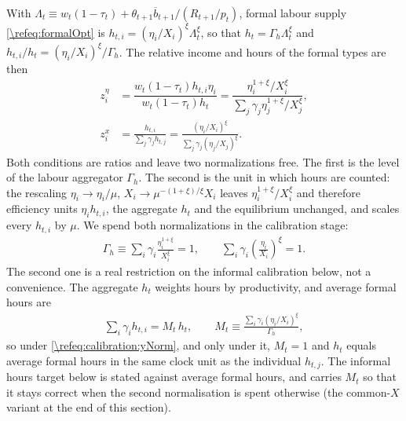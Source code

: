 With $\Lambda_t\equiv w_t(1-\tau_t)+\theta_{t+1}\overline{b}_{t+1}/(R_{t+1}/p_t)$, formal labour supply \eqref{\refeq:formalOpt} is $h_{t,i} = (\eta_i/X_i)^{\xi}\Lambda_t^{\xi}$, so that $h_t = \Gamma_h\Lambda_t^{\xi}$ and $h_{t,i}/h_t = (\eta_i/X_i)^{\xi}/\Gamma_h$. The relative income and hours of the formal types are then
\begin{align*}
        z_i^{\eta} &= \dfrac{w_t(1-\tau_t)h_{t,i} \eta_i}{w_t(1-\tau_t)h_t} = \dfrac{\eta_i^{1+\xi}/X_i^{\xi}}{\sum_{j} \gamma_ j\eta_j^{1+\xi}/X_j^{\xi}},  \\
        z_i^{x} &= \frac{h_{t,i}}{\sum_j\gamma_j h_{t,j}} = \frac{(\eta_i/X_i)^{\xi}}{\sum_j \gamma_j(\eta_j/X_j)^{\xi}}.
\end{align*}
Both conditions are ratios and leave two normalizations free. The first is the level of the labour aggregator $\Gamma_h$. The second is the unit in which hours are counted: the rescaling $\eta_i\rightarrow\eta_i/\mu$, $X_i\rightarrow\mu^{-(1+\xi)/\xi}X_i$ leaves $\eta_i^{1+\xi}/X_i^{\xi}$ and therefore efficiency units $\eta_ih_{t,i}$, the aggregate $h_t$ and the equilibrium unchanged, and scales every $h_{t,i}$ by $\mu$. We spend both normalizations in the calibration stage:
\begin{align}\label{\refeq:calibration:yNorm}
    \Gamma_h\equiv\sum_i\gamma_i\frac{\eta_i^{1+\xi}}{X_i^{\xi}} = 1, \qquad \sum_i\gamma_i\left(\frac{\eta_i}{X_i}\right)^{\xi} = 1.
\end{align}
The second one is a real restriction on the informal calibration below, not a convenience. The aggregate $h_t$ weights hours by productivity, and average formal hours are
\begin{align}\label{\refeq:calibration:M}
    \sum_i\gamma_ih_{t,i} = M_t\,h_t, \qquad M_t \equiv \frac{\sum_i\gamma_i(\eta_i/X_i)^{\xi}}{\Gamma_h},
\end{align}
so under \eqref{\refeq:calibration:yNorm}, and only under it, $M_t = 1$ and $h_t$ equals average formal hours in the same clock unit as the individual $h_{t,j}$. The informal hours target below is stated against average formal hours, and carries $M_t$ so that it stays correct when the second normalisation is spent otherwise (the common-$X$ variant at the end of this section).

